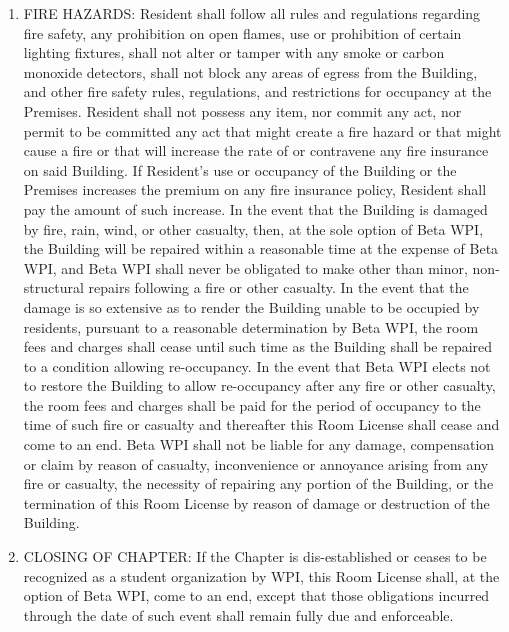 \documentclass[legalpaper, 12pt]{article}
\begin{document}
\begin{enumerate}
        \item FIRE HAZARDS\@: Resident shall follow all rules and regulations
                regarding fire safety, any prohibition on open flames, use or
                prohibition of certain lighting fixtures, shall not alter or
                tamper with any smoke or carbon monoxide detectors, shall not
                block any areas of egress from the Building, and other fire
                safety rules, regulations, and restrictions for occupancy at the
                Premises.  Resident shall not possess any item, nor commit any
                act, nor permit to be committed any act that might create a fire
                hazard or that might cause a fire or that will increase the rate
                of or contravene any fire insurance on said Building.  If
                Resident’s use or occupancy of the Building or the Premises
                increases the premium on any fire insurance policy, Resident
                shall pay the amount of such increase.  In the event that the
                Building is damaged by fire, rain, wind, or other casualty,
                then, at the sole option of Beta WPI, the Building will be
                repaired within a reasonable time at the expense of Beta WPI,
                and Beta WPI shall never be obligated to make other than minor,
                non-structural repairs following a fire or other casualty.  In
                the event that the damage is so extensive as to render the
                Building unable to be occupied by residents, pursuant to a
                reasonable determination by Beta WPI, the room fees and charges
                shall cease until such time as the Building shall be repaired to
                a condition allowing re-occupancy.  In the event that Beta WPI
                elects not to restore the Building to allow re-occupancy after
                any fire or other casualty, the room fees and charges shall be
                paid for the period of occupancy to the time of such fire or
                casualty and thereafter this Room License shall cease and come
                to an end. Beta WPI shall not be liable for any damage,
                compensation or claim by reason of casualty, inconvenience or
                annoyance arising from any fire or casualty, the necessity of
                repairing any portion of the Building, or the termination of
                this Room License by reason of damage or destruction of the
                Building.

        \item CLOSING OF CHAPTER\@: If the Chapter is dis-established or ceases to
                be recognized as a student organization by WPI, this Room
                License shall, at the option of Beta WPI, come to an end, except
                that those obligations incurred through the date of such event
                shall remain fully due and enforceable.


\end{enumerate}
\end{document}
